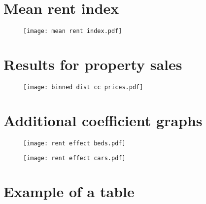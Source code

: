 \documentclass[10pt,openany,leqno]{e61note}
\begin{document}
\FloatBarrier
\section{Mean rent index}\label{app:rent-index}

\lipsum[1]

\begin{figure}[ht]
  \centering
  \caption{}\label{fig:rent-index}
  \texttt{[image: mean rent index.pdf]}
\end{figure}

\FloatBarrier
\section{Results for property sales}

\lipsum[1-2]

\begin{figure}[ht]
  \centering
  \caption{}\label{fig:price_bins}
  \texttt{[image: binned dist cc prices.pdf]}
\end{figure}

\FloatBarrier
\section{Additional coefficient graphs}

\lipsum[1]

\lipsum[2]

\begin{figure}[htb]
\centering
\begin{minipage}{.35\textwidth}
  \centering
  \texttt{[image: rent effect beds.pdf]}
  \label{fig:rent-bed}
\end{minipage}
\begin{minipage}{.35\textwidth}
  \centering
  \texttt{[image: rent effect cars.pdf]}
  \label{fig:rent-car}
\end{minipage}
\end{figure}

\FloatBarrier
\section{Example of a table}
\end{document}
